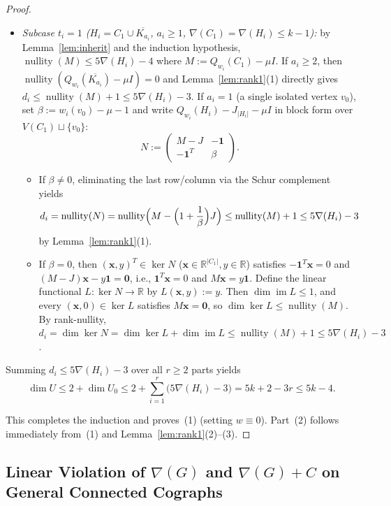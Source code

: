 \documentclass[11pt,a4paper]{article}
\theoremstyle{definition}
\DeclareMathOperator{\nullity}{nullity}
\DeclareMathOperator{\im}{im}
\begin{document}
\begin{proof}
\begin{itemize}
\begin{itemize}
\[      \]
      \item \emph{Subcase $t_i = 1$ ($H_i = C_1 \cup \overline{K_{a_i}}$, $a_i \ge 1$, $\nabla(C_1) = \nabla(H_i) \le k-1$):} by Lemma~\ref{lem:inherit} and the induction hypothesis, $\nullity(M) \le 5\nabla(H_i) - 4$ where $M := Q_{w_i}(C_1) - \mu I$. If $a_i \ge 2$, then $\nullity(Q_{w_i}(\overline{K_{a_i}}) - \mu I) = 0$ and Lemma~\ref{lem:rank1}(1) directly gives $d_i \le \nullity(M) + 1 \le 5\nabla(H_i) - 3$. If $a_i = 1$ (a single isolated vertex $v_0$), set $\beta := w_i(v_0) - \mu - 1$ and write $Q_{w_i}(H_i) - J_{|H_i|} - \mu I$ in block form over $V(C_1) \sqcup \{v_0\}$:
      \[
        N := \begin{pmatrix} M - J & -\mathbf{1} \\ -\mathbf{1}^T & \beta \end{pmatrix}.
      \]
      \begin{itemize}
        \item If $\beta \ne 0$, eliminating the last row/column via the Schur complement yields
        \[
          d_i = \nullity(N) = \nullity\Bigl(M - \Bigl(1 + \frac{1}{\beta}\Bigr)J\Bigr) \le \nullity(M) + 1 \le 5\nabla(H_i) - 3
        \]
        by Lemma~\ref{lem:rank1}(1).
        \item If $\beta = 0$, then $(\mathbf{x}, y)^T \in \ker N$ ($\mathbf{x} \in \mathbb{R}^{|C_1|}, y \in \mathbb{R}$) satisfies $-\mathbf{1}^T \mathbf{x} = 0$ and $(M - J)\mathbf{x} - y\mathbf{1} = \mathbf{0}$, i.e., $\mathbf{1}^T \mathbf{x} = 0$ and $M\mathbf{x} = y\mathbf{1}$. Define the linear functional $L : \ker N \to \mathbb{R}$ by $L(\mathbf{x}, y) := y$. Then $\dim\im L \le 1$, and every $(\mathbf{x}, 0) \in \ker L$ satisfies $M\mathbf{x} = \mathbf{0}$, so $\dim\ker L \le \nullity(M)$. By rank-nullity, $d_i = \dim\ker N = \dim\ker L + \dim\im L \le \nullity(M) + 1 \le 5\nabla(H_i) - 3$.
      \end{itemize}
    \end{itemize}
    Summing $d_i \le 5\nabla(H_i) - 3$ over all $r \ge 2$ parts yields
    \[
      \dim U \le 2 + \dim U_0 \le 2 + \sum_{i=1}^r \bigl(5\nabla(H_i) - 3\bigr) = 5k + 2 - 3r \le 5k - 4.
    \]
  \end{itemize}
  This completes the induction and proves~(1) (setting $w \equiv 0$). Part~(2) follows immediately from~(1) and Lemma~\ref{lem:rank1}(2)--(3).
\end{proof}

\subsection{Linear Violation of $\nabla(G)$ and $\nabla(G)+C$ on General Connected Cographs}
\end{document}
